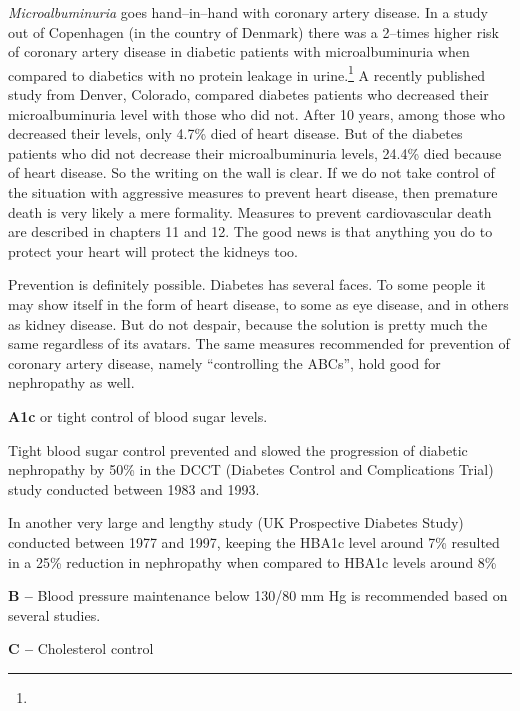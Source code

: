 \textit{Microalbuminuria} goes hand–in–hand with coronary artery disease. In a study out of Copenhagen (in the country of Denmark) there was a 2–times higher risk of coronary artery disease in diabetic patients with microalbuminuria when compared to diabetics with no protein leakage in urine.\footnote{} A recently published study from Denver, Colorado, compared diabetes patients who decreased their microalbuminuria level with those who did not. After 10 years, among those who decreased their levels, only 4.7\% died of heart disease. But of the diabetes patients who did not decrease their microalbuminuria levels, 24.4\% died because of heart disease. So the writing on the wall is clear.  If we do not take control of the situation with aggressive measures to prevent heart disease, then premature death is very likely a mere formality. Measures to prevent cardiovascular death are described in chapters 11 and 12. The good news is that anything you do to protect your heart will protect the kidneys too.


Prevention is definitely possible. Diabetes has several faces. To some people it may show itself in the form of heart disease, to some as eye disease, and in others as kidney disease. But do not despair, because the solution is pretty much the same regardless of its avatars. The same measures recommended for prevention of coronary artery disease, namely “controlling the ABCs”, hold good for nephropathy as well.

\item 
 \textbf{A1c} or tight control of blood sugar levels.

 Tight blood sugar control prevented and slowed the progression of diabetic nephropathy by 50\% in the DCCT (Diabetes Control and Complications Trial) study conducted between 1983 and 1993.

 In another very large and lengthy study (UK Prospective Diabetes Study) conducted between 1977 and 1997, keeping the HBA1c level around 7\% resulted in a 25\% reduction in nephropathy when compared to HBA1c levels around 8\%

 \item \textbf{B –} Blood pressure maintenance below 130/80 mm Hg is recommended based on several studies.

 \item \textbf{C –} Cholesterol control

